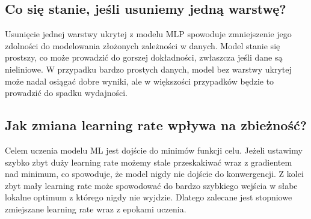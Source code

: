 \documentclass[12pt,a4paper]{article}
\begin{document}
\subsection{Co się stanie, jeśli usuniemy jedną warstwę?}
Usunięcie jednej warstwy ukrytej z modelu MLP spowoduje zmniejszenie jego zdolności do modelowania złożonych zależności w danych. Model stanie się prostszy, co może prowadzić do gorszej dokładności, zwłaszcza jeśli dane są nieliniowe. W przypadku bardzo prostych danych, model bez warstwy ukrytej może nadal osiągać dobre wyniki, ale w większości przypadków będzie to prowadzić do spadku wydajności.
\subsection{Jak zmiana learning rate wpływa na zbieżność?}
Celem uczenia modelu ML jest dojście do minimów funkcji celu. Jeżeli ustawimy szybko zbyt duży learning rate możemy stale przeskakiwać wraz z gradientem nad minimum, co spowoduje, że model nigdy nie dojście do konwergencji.
Z kolei zbyt mały learning rate może spowodować do bardzo szybkiego wejścia w słabe lokalne optimum z którego nigdy nie wyjdzie. Dlatego zalecane jest stopniowe zmiejszane learning rate wraz z epokami uczenia.
\end{document}

